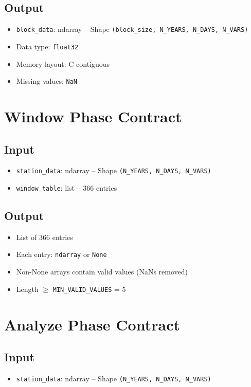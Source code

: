 ﻿\documentclass[12pt,a4paper]{report}
\begin{document}
\subsection{Output}
\begin{itemize}[leftmargin=*]
    \item \texttt{block\_data}: ndarray – Shape \texttt{(block\_size, N\_YEARS, N\_DAYS, N\_VARS)}
    \item Data type: \texttt{float32}
    \item Memory layout: C-contiguous
    \item Missing values: \texttt{NaN}
\end{itemize}

\section{Window Phase Contract}
\subsection{Input}
\begin{itemize}[leftmargin=*]
    \item \texttt{station\_data}: ndarray – Shape \texttt{(N\_YEARS, N\_DAYS, N\_VARS)}
    \item \texttt{window\_table}: list – 366 entries
\end{itemize}
\subsection{Output}
\begin{itemize}[leftmargin=*]
    \item List of 366 entries
    \item Each entry: \texttt{ndarray} or \texttt{None}
    \item Non-None arrays contain valid values (NaNs removed)
    \item Length $\ge$ \texttt{MIN\_VALID\_VALUES} = 5
\end{itemize}

\section{Analyze Phase Contract}
\subsection{Input}
\begin{itemize}[leftmargin=*]
    \item \texttt{station\_data}: ndarray – Shape \texttt{(N\_YEARS, N\_DAYS, N\_VARS)}
\end{itemize}
\end{document}
